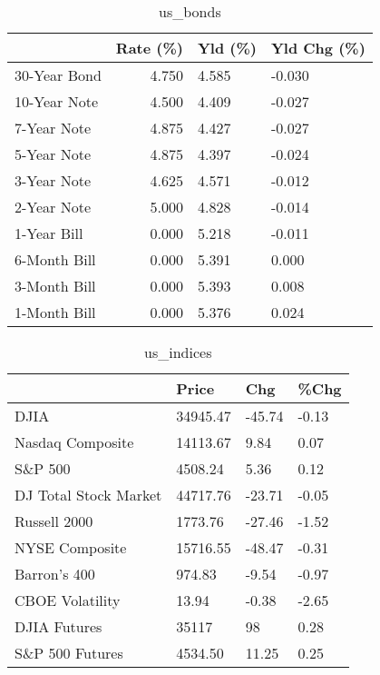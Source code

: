 \documentclass{article}%
\begin{document}
%


\begin{table}[htbp]%
\caption{us\_bonds}%
\centering%
\begin{adjustbox}{width=1\textwidth}%
\begin{tabular}{lrll}
\toprule
             &  Rate (\%) & Yld (\%) & Yld Chg (\%) \\
\midrule
30-Year Bond &     4.750 &   4.585 &      -0.030 \\
10-Year Note &     4.500 &   4.409 &      -0.027 \\
 7-Year Note &     4.875 &   4.427 &      -0.027 \\
 5-Year Note &     4.875 &   4.397 &      -0.024 \\
 3-Year Note &     4.625 &   4.571 &      -0.012 \\
 2-Year Note &     5.000 &   4.828 &      -0.014 \\
 1-Year Bill &     0.000 &   5.218 &      -0.011 \\
6-Month Bill &     0.000 &   5.391 &       0.000 \\
3-Month Bill &     0.000 &   5.393 &       0.008 \\
1-Month Bill &     0.000 &   5.376 &       0.024 \\
\bottomrule
\end{tabular}
%
\end{adjustbox}%
\end{table}

%


\begin{table}[htbp]%
\caption{us\_indices}%
\centering%
\begin{adjustbox}{width=1\textwidth}%
\begin{tabular}{llll}
\toprule
                      &    Price &    Chg &  \%Chg \\
\midrule
                 DJIA & 34945.47 & -45.74 & -0.13 \\
     Nasdaq Composite & 14113.67 &   9.84 &  0.07 \\
              S\&P 500 &  4508.24 &   5.36 &  0.12 \\
DJ Total Stock Market & 44717.76 & -23.71 & -0.05 \\
         Russell 2000 &  1773.76 & -27.46 & -1.52 \\
       NYSE Composite & 15716.55 & -48.47 & -0.31 \\
         Barron's 400 &   974.83 &  -9.54 & -0.97 \\
      CBOE Volatility &    13.94 &  -0.38 & -2.65 \\
         DJIA Futures &    35117 &     98 &  0.28 \\
      S\&P 500 Futures &  4534.50 &  11.25 &  0.25 \\
\bottomrule
\end{tabular}
%
\end{adjustbox}%
\end{table}
\end{document}
